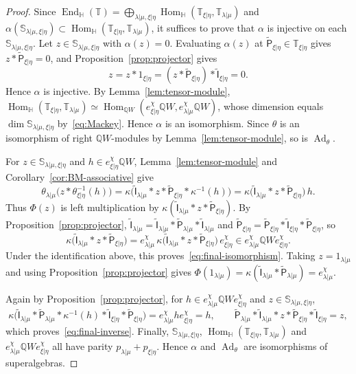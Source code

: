 \documentclass[11pt,a4paper]{amsart}
\theoremstyle{definition}
\theoremstyle{remark}
\newcommand{\Q}{\mathbb Q}
\newcommand{\bS}{\mathbb S}
\newcommand{\bH}{\mathbb H}
\newcommand{\bT}{\mathbb T}
\newcommand{\End}{\operatorname{End}}
\newcommand{\Hom}{\operatorname{Hom}}
\newcommand{\Ad}{\operatorname{Ad}}
\newcommand{\lm}{\lambda|\mu}
\newcommand{\xh}{\xi|\eta}
\numberwithin{equation}{section}
\begin{document}
\begin{proof}
Since $\End_{\bH}(\bT)=\bigoplus_{\lm,\xh}\Hom_{\bH}(\bT_{\xh},\bT_{\lm})$ and
$\alpha(\bS_{\lm,\xh})\subset\Hom_{\bH}(\bT_{\xh},\bT_{\lm})$, it suffices to prove
that $\alpha$ is injective on each $\bS_{\lm,\xh}$. Let $z\in\bS_{\lm,\xh}$
with $\alpha(z)=0$. Evaluating $\alpha(z)$ at
$\widetilde{\mathsf P}_{\xh}\in\bT_{\xh}$ gives
$z*\widetilde{\mathsf P}_{\xh}=0$, and Proposition~\ref{prop:projector}
gives
\begin{equation}\label{eq:faithfulness}
z=z*1_{\xh}=(z*\widetilde{\mathsf P}_{\xh})*\widetilde{\mathsf I}_{\xh}=0 .
\end{equation}
Hence $\alpha$ is injective. By Lemma~\ref{lem:tensor-module},
$\Hom_{\bH}(\bT_{\xh},\bT_{\lm})\simeq
\Hom_{\Q W}(e_{\xh}^\chi\Q W,e_{\lm}^\chi\Q W)$, whose dimension equals
$\dim\bS_{\lm,\xh}$ by~\eqref{eq:Mackey}. Hence $\alpha$ is an isomorphism.
Since $\theta$ is an isomorphism of right $\Q W$-modules by
Lemma~\ref{lem:tensor-module}, so is $\Ad_\theta$.

For $z\in\bS_{\lm,\xh}$ and $h\in e^\chi_{\xh}\Q W$,
Lemma~\ref{lem:tensor-module} and Corollary~\ref{cor:BM-associative} give
$$
\theta_{\lm}\bigl(z*\theta_{\xh}^{-1}(h)\bigr)
=\kappa\bigl(\widetilde{\mathsf I}_{\lm}*z*\widetilde{\mathsf P}_{\xh}
*\kappa^{-1}(h)\bigr)
=\kappa\bigl(\widetilde{\mathsf I}_{\lm}*z*\widetilde{\mathsf P}_{\xh}\bigr)\,h .
$$
Thus $\Phi(z)$ is left multiplication by
$\kappa(\widetilde{\mathsf I}_{\lm}*z*\widetilde{\mathsf P}_{\xh})$. By
Proposition~\ref{prop:projector},
$\widetilde{\mathsf I}_{\lm}
=\widetilde{\mathsf I}_{\lm}*\widetilde{\mathsf P}_{\lm}*\widetilde{\mathsf I}_{\lm}$
and
$\widetilde{\mathsf P}_{\xh}
=\widetilde{\mathsf P}_{\xh}*\widetilde{\mathsf I}_{\xh}*\widetilde{\mathsf P}_{\xh}$,
so
$$
\kappa\bigl(\widetilde{\mathsf I}_{\lm}*z*\widetilde{\mathsf P}_{\xh}\bigr)
=e^\chi_{\lm}\,
\kappa\bigl(\widetilde{\mathsf I}_{\lm}*z*\widetilde{\mathsf P}_{\xh}\bigr)\,
e^\chi_{\xh}\in e^\chi_{\lm}\Q We^\chi_{\xh}.
$$
Under the identification above, this proves~\eqref{eq:final-isomorphism}.
Taking $z=1_{\lm}$ and using Proposition~\ref{prop:projector} gives
$\Phi(1_{\lm})=\kappa(\widetilde{\mathsf I}_{\lm}*\widetilde{\mathsf P}_{\lm})
=e^\chi_{\lm}$.

Again by Proposition~\ref{prop:projector}, for
$h\in e^\chi_{\lm}\Q We^\chi_{\xh}$ and $z\in\bS_{\lm,\xh}$,
$$
\kappa\bigl(\widetilde{\mathsf I}_{\lm}*\widetilde{\mathsf P}_{\lm}
*\kappa^{-1}(h)*\widetilde{\mathsf I}_{\xh}*\widetilde{\mathsf P}_{\xh}\bigr)
=e^\chi_{\lm}he^\chi_{\xh}=h,\qquad
\widetilde{\mathsf P}_{\lm}*\widetilde{\mathsf I}_{\lm}*z
*\widetilde{\mathsf P}_{\xh}*\widetilde{\mathsf I}_{\xh}=z ,
$$
which proves~\eqref{eq:final-inverse}. Finally, $\bS_{\lm,\xh}$,
$\Hom_{\bH}(\bT_{\xh},\bT_{\lm})$ and $e^\chi_{\lm}\Q We^\chi_{\xh}$ all have
parity $p_{\lm}+p_{\xh}$. Hence $\alpha$ and $\Ad_\theta$ are
isomorphisms of superalgebras.
\end{proof}
\end{document}
